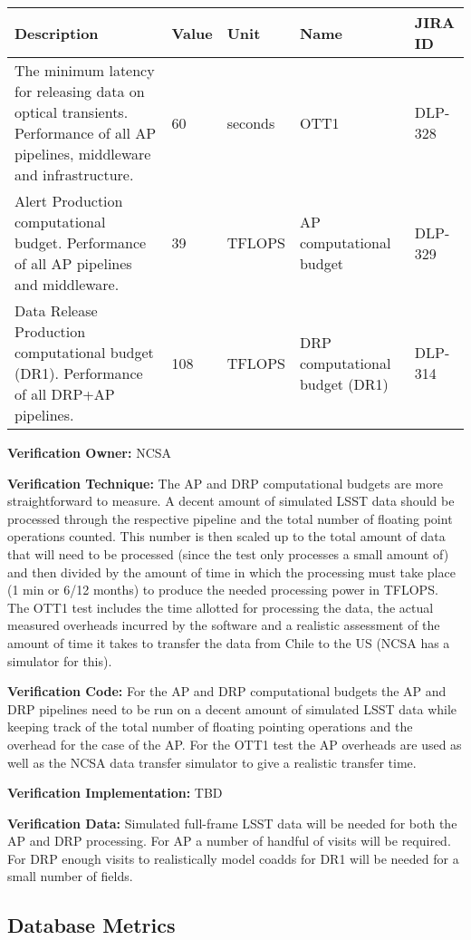 \begin{longtable}[]{@{}lllll@{}}
\toprule
Description & Value & Unit & Name & JIRA ID\tabularnewline
\midrule
\endhead
The minimum latency for releasing data on optical transients.
Performance of all AP pipelines, middleware and infrastructure. & 60 &
seconds & OTT1 & DLP-328\tabularnewline
Alert Production computational budget. Performance of all AP pipelines
and middleware. & 39 & TFLOPS & AP computational budget &
DLP-329\tabularnewline
Data Release Production computational budget (DR1). Performance of all
DRP+AP pipelines. & 108 & TFLOPS & DRP computational budget (DR1) &
DLP-314\tabularnewline
\bottomrule
\end{longtable}

\textbf{Verification Owner:} NCSA

\textbf{Verification Technique:} The AP and DRP computational budgets
are more straightforward to measure. A decent amount of simulated LSST
data should be processed through the respective pipeline and the total
number of floating point operations counted. This number is then scaled
up to the total amount of data that will need to be processed (since the
test only processes a small amount of) and then divided by the amount of
time in which the processing must take place (1 min or 6/12 months) to
produce the needed processing power in TFLOPS. The OTT1 test includes
the time allotted for processing the data, the actual measured overheads
incurred by the software and a realistic assessment of the amount of
time it takes to transfer the data from Chile to the US (NCSA has a
simulator for this).

\textbf{Verification Code:} For the AP and DRP computational budgets the
AP and DRP pipelines need to be run on a decent amount of simulated LSST
data while keeping track of the total number of floating pointing
operations and the overhead for the case of the AP. For the OTT1 test
the AP overheads are used as well as the NCSA data transfer simulator to
give a realistic transfer time.

\textbf{Verification Implementation:} TBD

\textbf{Verification Data:} Simulated full-frame LSST data will be
needed for both the AP and DRP processing. For AP a number of handful of
visits will be required. For DRP enough visits to realistically model
coadds for DR1 will be needed for a small number of fields.

\subsection{Database Metrics}\label{database-metrics}

